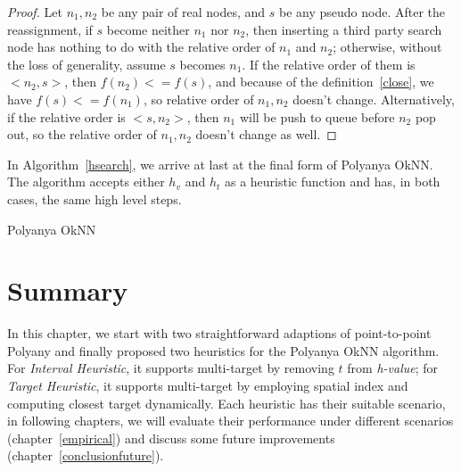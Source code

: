 \begin{proof}
  Let $n_1, n_2$ be any pair of real nodes, and $s$ be any pseudo node.  After the reassignment,
  if $s$ become neither $n_1$ nor $n_2$, then inserting a third party search node has nothing to do with the relative order of $n_1$
  and $n_2$; otherwise, without the loss of generality, assume $s$ becomes $n_1$. If the relative
  order of them is $<n_2, s>$, then $f(n_2) <= f(s)$, and
  because of the definition~\ref{close}, we have $f(s) <= f(n_1)$, so
  relative order of $n_1, n_2$ doesn't change. Alternatively, if the relative order is $<s, n_2>$,
  then $n_1$  will be push to queue before $n_2$ pop out, so the relative order of $n_1, n_2$ doesn't
  change as well.%
\end{proof}

In Algorithm~\ref{hsearch}, we arrive at last at the final form of Polyanya OkNN. The algorithm
accepts either $h_v$ and $h_t$ as a heuristic function and has, in both cases, the same high level steps.

\begin{algorithm}[!ht]
  
  \caption{Polyanya OkNN}
  \label{hsearch}
\end{algorithm}

\section{Summary}
In this chapter, we start with two straightforward adaptions of point-to-point Polyany
and finally proposed two heuristics for the Polyanya OkNN algorithm.
For \textit{Interval Heuristic}, it supports multi-target by
removing $t$ from \textit{h-value}; for \textit{Target Heuristic}, it supports multi-target by
employing spatial index and computing closest target dynamically. Each heuristic has their
suitable scenario, in following chapters, we will evaluate their performance under different
scenarios (chapter~\ref{empirical})  and discuss some future improvements
(chapter~\ref{conclusionfuture}). 
